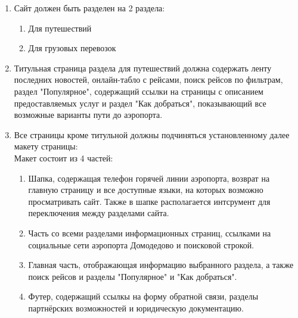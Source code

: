 
\begin{enumerate}
      \item Сайт должен быть разделен на 2 раздела:
            \begin{enumerate}
                  \item Для путешествий
                  \item Для грузовых перевозок
            \end{enumerate}

      \item Титульная страница раздела для путешествий
            должна содержать ленту последних новостей,
            онлайн-табло с рейсами, поиск рейсов по фильтрам,
            раздел "Популярное", содержащий ссылки на
            страницы с описанием предоставляемых услуг и
            раздел "Как добраться", показывающий все
            возможные варианты пути до аэропорта.

      \item Все страницы кроме титульной должны подчиняться
            установленному далее макету страницы: \\
            Макет состоит из 4 частей:

            \begin{enumerate}
                  \item Шапка, содержащая телефон горячей линии
                        аэропорта, возврат на главную страницу и все
                        доступные языки, на которых возможно
                        просматривать сайт. Также в шапке располагается
                        интсрумент для переключения между разделами
                        сайта.

                  \item Часть со всеми разделами информационных
                        страниц, ссылками на социальные сети аэропорта
                        Домодедово и поисковой строкой.

                  \item Главная часть, отображающая информацию
                        выбранного раздела, а также поиск рейсов и разделы
                        "Популярное" и "Как добраться".

                  \item Футер, содержащий ссылкы на форму обратной
                        связи, разделы партнёрских возможностей и
                        юридическую документацию.
            \end{enumerate}

\end{enumerate}
